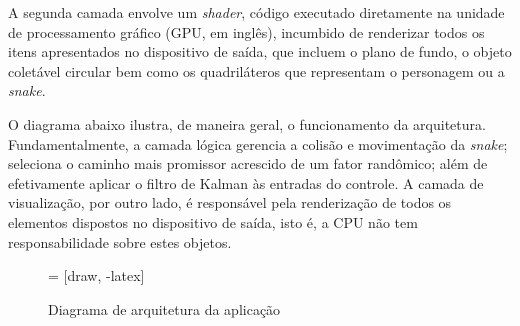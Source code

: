 \documentclass[conference]{IEEEtran}
\begin{document}
A segunda camada envolve um \textit{shader}, código executado diretamente na unidade de processamento gráfico (GPU, em inglês), incumbido de renderizar todos os itens apresentados no dispositivo de saída, que incluem o plano de fundo, o objeto coletável circular bem como os quadriláteros que representam o personagem ou a \textit{snake}.

O diagrama abaixo ilustra, de maneira geral, o funcionamento da arquitetura. Fundamentalmente, a camada lógica gerencia a colisão e movimentação da \textit{snake}; seleciona o caminho mais promissor acrescido de um fator randômico; além de efetivamente aplicar o filtro de Kalman às entradas do controle. A camada de visualização, por outro lado, é responsável pela renderização de todos os elementos dispostos no dispositivo de saída, isto é, a CPU não tem responsabilidade sobre estes objetos.

\begin{figure}[H]
\centering
{} = [draw, -latex]
\caption{Diagrama de arquitetura da aplicação}
\label{fig:diagramaArquitetura}
\end{figure}
\end{document}
